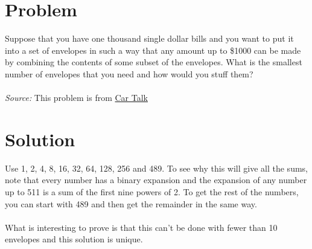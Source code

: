 \documentclass[11pt,a4paper]{report}
\theoremstyle{plain}
\theoremstyle{definition}
\theoremstyle{remark}
\begin{document}
\section*{Problem}
Suppose that you have one thousand single dollar bills and you want to put it into a set of envelopes in such a way that any amount up to \$1000 can be made by combining the contents of some subset of the envelopes.  What is the smallest number of envelopes that you need and how would you stuff them?
\\
\\
\textit{Source:} This problem is from \href{https://www.cartalk.com}{Car Talk}

\section*{Solution}
 Use 1, 2, 4, 8, 16, 32, 64, 128, 256 and 489.  To see why this will give all the sums, note that every number has a binary expansion and the expansion of any number up to 511 is a sum of the first nine powers of 2.  To get the rest of the numbers, you can start with 489 and then get the remainder in the same way.  
 \\
 \\
 What is interesting to prove is that this can't be done with fewer than 10 envelopes and this solution is unique.
 
\end{document}
